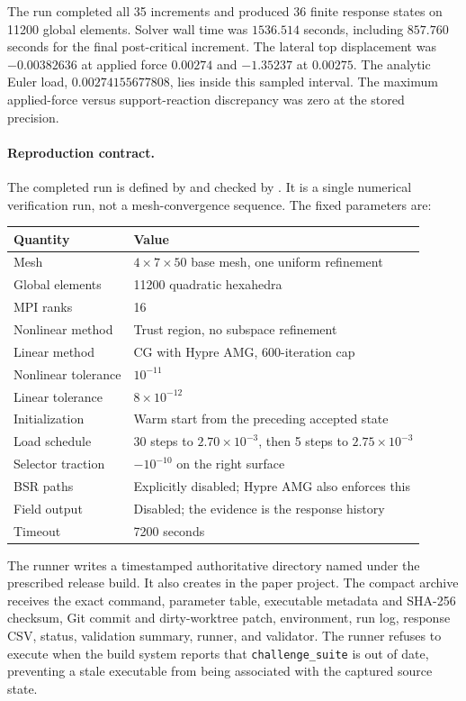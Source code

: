 \documentclass[11pt]{article}
\begin{document}
The run completed all 35 increments and produced 36 finite response states on
11200 global elements.  Solver wall time was $1536.514$ seconds, including
$857.760$ seconds for the final post-critical increment.  The lateral top
displacement was $-0.00382636$ at applied force $0.00274$ and $-1.35237$ at
$0.00275$.  The analytic Euler load, $0.00274155677808$, lies inside this sampled
interval.  The maximum applied-force versus support-reaction discrepancy was
zero at the stored precision.

\paragraph{Reproduction contract.}
The completed run is defined by
 and checked by
.  It is a single numerical
verification run, not a mesh-convergence sequence.  The fixed parameters are:

\begin{center}
\begin{tabular}{@{}ll@{}}
\toprule
Quantity & Value \\
\midrule
Mesh & $4\times7\times50$ base mesh, one uniform refinement \\
Global elements & 11200 quadratic hexahedra \\
MPI ranks & 16 \\
Nonlinear method & Trust region, no subspace refinement \\
Linear method & CG with Hypre AMG, 600-iteration cap \\
Nonlinear tolerance & $10^{-11}$ \\
Linear tolerance & $8\times10^{-12}$ \\
Initialization & Warm start from the preceding accepted state \\
Load schedule & 30 steps to $2.70\times10^{-3}$, then 5 steps to $2.75\times10^{-3}$ \\
Selector traction & $-10^{-10}$ on the right surface \\
BSR paths & Explicitly disabled; Hypre AMG also enforces this \\
Field output & Disabled; the evidence is the response history \\
Timeout & 7200 seconds \\
\bottomrule
\end{tabular}
\end{center}

The runner writes a timestamped authoritative directory named
 under the prescribed
release build.  It also creates
 in the paper project.
The compact archive receives the exact command, parameter table, executable
metadata and SHA-256 checksum, Git commit and dirty-worktree patch, environment,
run log, response CSV, status, validation summary, runner, and validator.
The runner refuses to execute when the build system reports that
\texttt{challenge\_suite} is out of date, preventing a stale executable from
being associated with the captured source state.
\end{document}
